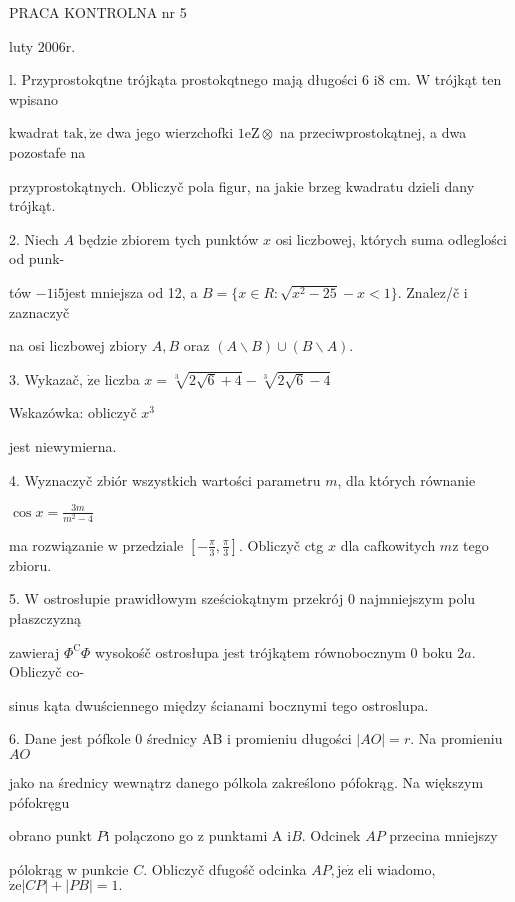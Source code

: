 \documentclass[a4paper,12pt]{article}
\begin{document}
PRACA KONTROLNA nr 5

luty $2006\mathrm{r}.$

l. Przyprostokqtne trójkąta prostokqtnego mają długości 6 $\mathrm{i}8$ cm. $\mathrm{W}$ trójkąt ten wpisano

kwadrat $\mathrm{t}\mathrm{a}\mathrm{k}, \dot{\mathrm{z}}\mathrm{e}$ dwa jego wierzchofki $ 1\mathrm{e}\mathrm{Z}\otimes$ na przeciwprostokątnej, a dwa pozostafe na

przyprostokątnych. Obliczyč pola figur, na jakie brzeg kwadratu dzieli dany trójkąt.

2. Niech $A$ będzie zbiorem tych punktów $x$ osi liczbowej, których suma odleglości od punk-

tów $-1\mathrm{i}5$jest mniejsza od 12, a $B=\{x\in R:\sqrt{x^{2}-25}-x<1\}$. Znalez/č $\mathrm{i}$ zaznaczyč

na osi liczbowej zbiory $A, B$ oraz $(A\backslash B)\cup(B\backslash A).$

3. Wykazač, $\dot{\mathrm{z}}\mathrm{e}$ liczba $x=\sqrt[3]{2\sqrt{6}+4}-\sqrt[3]{2\sqrt{6}-4}$

Wskazówka: obliczyč $x^{3}$

jest niewymierna.

4. Wyznaczyč zbiór wszystkich wartości parametru $m$, dla których równanie

$\displaystyle \cos x=\frac{3m}{m^{2}-4}$

ma rozwiązanie $\mathrm{w}$ przedziale $[-\displaystyle \frac{\pi}{3},\frac{\pi}{3}]$. Obliczyč ctg $x$ dla cafkowitych $m\mathrm{z}$ tego zbioru.

5. $\mathrm{W}$ ostrosłupie prawidłowym sześciokątnym przekrój $0$ najmniejszym polu płaszczyzną

zawieraj $\Phi^{\mathrm{C}}\Phi$ wysokośč ostrosłupa jest trójkątem równobocznym $0$ boku $2a$. Obliczyč co-

sinus kąta dwuściennego między ścianami bocznymi tego ostroslupa.

6. Dane jest pófkole $0$ średnicy AB $\mathrm{i}$ promieniu długości $|AO| = r$. Na promieniu $AO$

jako na średnicy wewnątrz danego pólkola zakreślono pófokrąg. Na większym pófokręgu

obrano punkt $P \mathrm{i}$ polączono go $\mathrm{z}$ punktami A $\mathrm{i} B$. Odcinek $AP$ przecina mniejszy

pólokrąg $\mathrm{w}$ punkcie $C$. Obliczyč dfugośč odcinka $AP, \mathrm{j}\mathrm{e}\dot{\mathrm{z}}$ eli wiadomo, $\dot{\mathrm{z}}\mathrm{e}|CP|+|PB|=1.$
\end{document}

